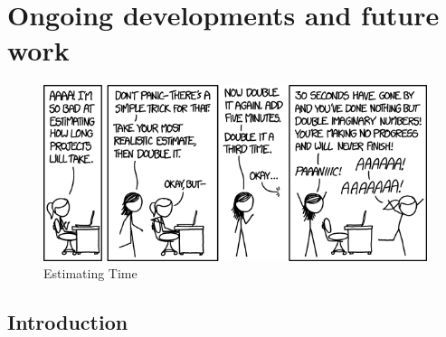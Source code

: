 \chapter{Ongoing developments and future work}
\begin{figure}[H]
    \centering
    \includegraphics[width=\textwidth]{figures/estimating_time.png}
    \caption{Estimating Time \cite{xkcdEstimatingTime2016}}
    \label{fig:xkcd_time}
\end{figure}

\section{Introduction}



